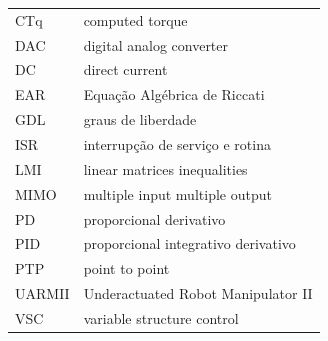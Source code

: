 \begin{xltabular}{\textwidth}{p{0.15\textwidth} p{0.80\textwidth}}
    CTq    & computed torque                     \\
    DAC    & digital analog converter            \\
    DC     & direct current                      \\
    EAR    & Equação Algébrica de Riccati        \\
    GDL    & graus de liberdade                  \\
    ISR    & interrupção de serviço e rotina     \\
    LMI    & linear matrices inequalities        \\
    MIMO   & multiple input multiple output      \\
    PD     & proporcional derivativo             \\
    PID    & proporcional integrativo derivativo \\
    PTP    & point to point                      \\
    UARMII & Underactuated Robot Manipulator II  \\
    VSC    & variable structure control          \\
\end{xltabular}
